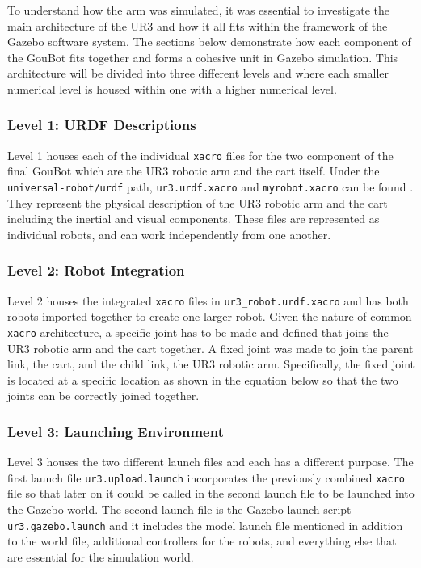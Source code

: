         To understand how the arm was simulated, it was essential to investigate the main architecture of the UR3 and how it all fits within the framework of the Gazebo software system. The sections below demonstrate how each component of the GouBot fits together and forms a cohesive unit in Gazebo simulation. This architecture will be divided into three different levels and where each smaller numerical level is housed within one with a higher numerical level. 
        
        \subsubsection*{Level 1: URDF Descriptions}
            
            Level 1 houses each of the individual \lstinline!xacro! files for the two component of the final GouBot which are the UR3 robotic arm and the cart itself. Under the \lstinline!universal-robot/urdf! path, \lstinline!ur3.urdf.xacro! and \lstinline!myrobot.xacro! can be found \cite{diff_drive_robot}. They represent the physical description of the UR3 robotic arm and the cart including the inertial and visual components. These files are represented as individual robots, and can work independently from one another.
            
        \subsubsection*{Level 2: Robot Integration}
                
            Level 2 houses the integrated \lstinline!xacro! files in \lstinline!ur3_robot.urdf.xacro! and has both robots imported together to create one larger robot. Given the nature of common \lstinline!xacro! architecture, a specific joint has to be made and defined that joins the UR3 robotic arm and the cart together. A fixed joint was made to join the parent link, the cart, and the child link, the UR3 robotic arm. Specifically, the fixed joint is located at a specific location as shown in the equation below so that the two joints can be correctly joined together.
        
        \subsubsection*{Level 3: Launching Environment}
            
            Level 3 houses the two different launch files and each has a different purpose. The first launch file  \lstinline!ur3.upload.launch! incorporates the previously combined \lstinline!xacro! file so that later on it could be called in the second launch file to be launched into the Gazebo world. The second launch file is the Gazebo launch script \lstinline!ur3.gazebo.launch! and it includes the model launch file mentioned in addition to the world file, additional controllers for the robots, and everything else that are essential for the simulation world. 
    
